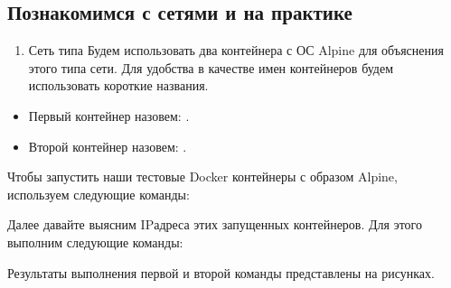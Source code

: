 \documentclass[letterpaper,10pt,russian]{sphinxmanual}
\begin{document}
\subsection{Познакомимся с сетями  и  на практике}
\label{\detokenize{educational_materials/docker_network/content:bridge-host}}\begin{enumerate}
%
\item {} 
\sphinxAtStartPar
Сеть типа 
Будем использовать два контейнера с ОС Alpine для объяснения этого типа сети. Для удобства в качестве имен контейнеров будем использовать короткие названия.

\end{enumerate}
\begin{itemize}
\item {} 
\sphinxAtStartPar
Первый контейнер назовем: .

\item {} 
\sphinxAtStartPar
Второй контейнер назовем: .

\end{itemize}

\sphinxAtStartPar
Чтобы запустить наши тестовые Docker контейнеры с образом Alpine, используем следующие команды:

\begin{sphinxVerbatim}[commandchars=\\\{\}]
\end{sphinxVerbatim}

\sphinxAtStartPar
Далее давайте выясним IP\sphinxhyphen{}адреса этих запущенных контейнеров. Для этого выполним следующие команды:

\begin{sphinxVerbatim}[commandchars=\\\{\}]
\end{sphinxVerbatim}

\sphinxAtStartPar
Результаты выполнения первой и второй команды представлены на рисунках.

\sphinxAtStartPar
{}
\end{document}
